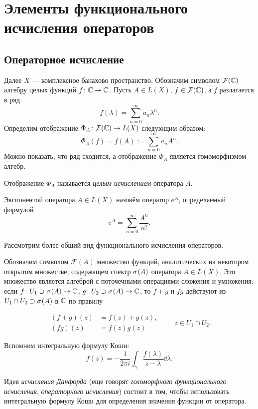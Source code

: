 \section{Элементы функционального исчисления операторов}
\subsection{Операторное исчисление}
Далее $X$ --- комплексное банахово пространство. Обозначим символом
$\mathcal F(\mathbb{C})$ алгебру целых функций $f \colon \mathbb{C} \to \mathbb{C}$.
Пусть $A \in L(X)$, $f \in \mathcal F(\mathbb{C})$, а $f$ разлагается в ряд
\[ f(\lambda) = \sum_{n=0}^\infty a_n \lambda^n. \]
Определим отображение $\Phi_A \colon \mathcal F(\mathbb{C}) \to L(X)$ следующим образом:
\[ \Phi_A(f) = f(A) := \sum_{n=0}^\infty a_n A^n. \]
Можно показать, что ряд сходится, а отображение $\Phi_A$ является гомоморфизмом алгебр.

Отображение $\Phi_A$ называется \emph{целым исчислением} оператора $A$.

\begin{example}
    Экспонентой оператора $A \in L(X)$ назовём оператор $e^A$, определяемый формулой
    \[ e^A = \sum_{n=0}^\infty \frac{A^n}{n!}. \]
\end{example}

Рассмотрим более общий вид функционального исчисления операторов.

Обозначим символом $\mathcal F(A)$ множество функций, аналитических на некотором открытом
множестве, содержащем спектр $\spectrum{A}$ оператора $A \in L(X)$. Это множество является алгеброй с
поточечными операциями сложения и умножения: если $f \colon U_1 \supset \spectrum{A} \to \fieldc$,
$g \colon U_2 \supset \spectrum{A} \to \fieldc$, то $f + g$ и $fg$ действуют из $U_1 \cap U_2 \supset \spectrum{A}$ в
$\mathbb{C}$ по правилу

\[ \begin{aligned}
    (f + g)(z) &= f(z) + g(z), \\
    (fg)(z) &= f(z)g(z)
\end{aligned} \quad\quad z \in U_1 \cap U_2. \]

Вспомним интегральную формулу Коши:
\[ f(z) = -\frac{1}{2\pi i} \int_{\gamma} \frac{f(\lambda)}{z - \lambda} \dd \lambda. \]

Идея \emph{исчисления Данфорда} (еще говорят \emph{голоморфного функционального исчисления},
\emph{операторного исчисления}) состоит в том, чтобы использовать интегральную формулу Коши для 
определения значения функции от оператора.

